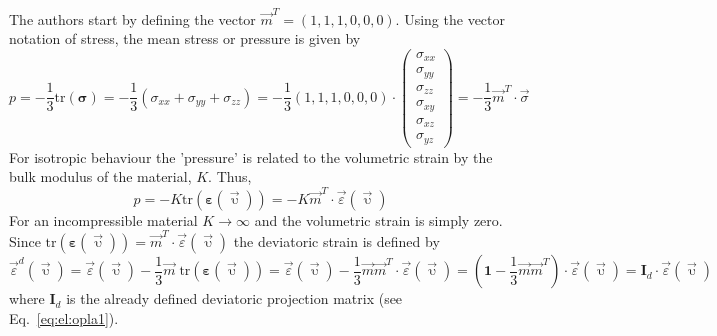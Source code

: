 The authors start by defining the vector $\vec{m}^T=(1,1,1,0,0,0)$.
Using the vector notation of stress, the mean stress or pressure is given by
\[
p 
= -\frac13 \textrm{tr}({\bm \sigma}) 
= -\frac13 (\sigma_{xx}+\sigma_{yy}+\sigma_{zz})
= -\frac13
\left(1,1,1,0,0,0\right)
\cdot
\left(
\begin{array}{c}
\sigma_{xx}\\
\sigma_{yy}\\
\sigma_{zz}\\
\sigma_{xy}\\
\sigma_{xz}\\
\sigma_{yz}
\end{array}
\right)
= -\frac13 \vec{m}^T\cdot \vec{\sigma}
\]
For isotropic behaviour the 'pressure' is related to the volumetric strain by the bulk modulus of the material, $K$. Thus,
\[
p
=-K \textrm{tr}(\bm\varepsilon(\vec\upupsilon)) 
= -K \vec{m}^T\cdot \vec{\varepsilon}(\vec\upupsilon)
\]
For an incompressible material $K\rightarrow \infty$ and the volumetric strain is simply zero. Since $\textrm{tr}(\bm\varepsilon(\vec\upupsilon))=\vec{m}^T\cdot \vec{\varepsilon}(\vec\upupsilon)$ the deviatoric strain is defined by
\[
\vec\varepsilon^d (\vec\upupsilon)
= \vec\varepsilon(\vec\upupsilon)-\frac13 \vec{m}\; \textrm{tr}(\bm\varepsilon(\vec\upupsilon))
= \vec\varepsilon(\vec\upupsilon)-\frac13 \vec{m} \vec{m}^T\cdot \vec{\varepsilon}(\vec\upupsilon)
= \left( {\bm 1} -\frac13 \vec{m} \vec{m}^T \right) \cdot \vec{\varepsilon}(\vec\upupsilon)
= {\bm I}_d \cdot \vec{\varepsilon}(\vec\upupsilon)
\]
where ${\bm I}_d$ is the already defined deviatoric projection matrix
(see Eq.~\eqref{eq:el:opla1}).

